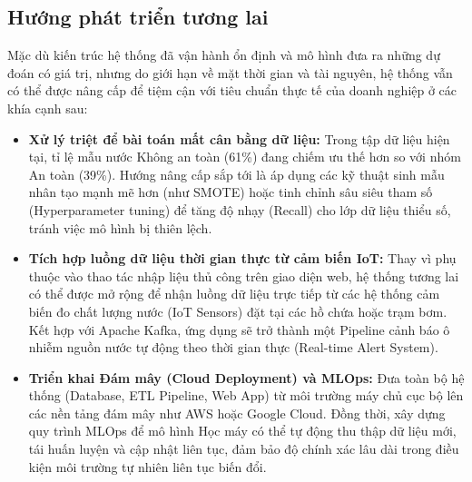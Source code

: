 \subsection{Hướng phát triển tương lai}
Mặc dù kiến trúc hệ thống đã vận hành ổn định và mô hình đưa ra những dự đoán có giá trị, nhưng do giới hạn về mặt thời gian và tài nguyên, hệ thống vẫn có thể được nâng cấp để tiệm cận với tiêu chuẩn thực tế của doanh nghiệp ở các khía cạnh sau:

\begin{itemize}
    \item \textbf{Xử lý triệt để bài toán mất cân bằng dữ liệu:} Trong tập dữ liệu hiện tại, tỉ lệ mẫu nước Không an toàn (61\%) đang chiếm ưu thế hơn so với nhóm An toàn (39\%). Hướng nâng cấp sắp tới là áp dụng các kỹ thuật sinh mẫu nhân tạo mạnh mẽ hơn (như SMOTE) hoặc tinh chỉnh sâu siêu tham số (Hyperparameter tuning) để tăng độ nhạy (Recall) cho lớp dữ liệu thiểu số, tránh việc mô hình bị thiên lệch.
    
    \item \textbf{Tích hợp luồng dữ liệu thời gian thực từ cảm biến IoT:} Thay vì phụ thuộc vào thao tác nhập liệu thủ công trên giao diện web, hệ thống tương lai có thể được mở rộng để nhận luồng dữ liệu trực tiếp từ các hệ thống cảm biến đo chất lượng nước (IoT Sensors) đặt tại các hồ chứa hoặc trạm bơm. Kết hợp với Apache Kafka, ứng dụng sẽ trở thành một Pipeline cảnh báo ô nhiễm nguồn nước tự động theo thời gian thực (Real-time Alert System).
    
    \item \textbf{Triển khai Đám mây (Cloud Deployment) và MLOps:} Đưa toàn bộ hệ thống (Database, ETL Pipeline, Web App) từ môi trường máy chủ cục bộ lên các nền tảng đám mây như AWS hoặc Google Cloud. Đồng thời, xây dựng quy trình MLOps để mô hình Học máy có thể tự động thu thập dữ liệu mới, tái huấn luyện và cập nhật liên tục, đảm bảo độ chính xác lâu dài trong điều kiện môi trường tự nhiên liên tục biến đổi.
\end{itemize}